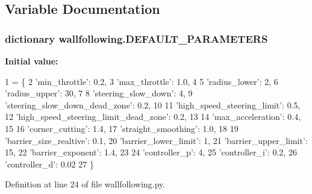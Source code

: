 \subsection{Variable Documentation}
\subsubsection[{\texorpdfstring{D\+E\+F\+A\+U\+L\+T\+\_\+\+P\+A\+R\+A\+M\+E\+T\+E\+RS}{DEFAULT_PARAMETERS}}]{\setlength{\rightskip}{0pt plus 5cm}dictionary wallfollowing.\+D\+E\+F\+A\+U\+L\+T\+\_\+\+P\+A\+R\+A\+M\+E\+T\+E\+RS}\hypertarget{namespacewallfollowing_ac161be1e11f04000d35ca725afa3ccdf}{}\label{namespacewallfollowing_ac161be1e11f04000d35ca725afa3ccdf}
{\bfseries Initial value\+:}
\begin{DoxyCode}
1 = \{
2     \textcolor{stringliteral}{'min\_throttle'}: 0.2,
3     \textcolor{stringliteral}{'max\_throttle'}: 1.0,
4 
5     \textcolor{stringliteral}{'radius\_lower'}: 2,
6     \textcolor{stringliteral}{'radius\_upper'}: 30,
7 
8     \textcolor{stringliteral}{'steering\_slow\_down'}: 4,
9     \textcolor{stringliteral}{'steering\_slow\_down\_dead\_zone'}: 0.2,
10 
11     \textcolor{stringliteral}{'high\_speed\_steering\_limit'}: 0.5,
12     \textcolor{stringliteral}{'high\_speed\_steering\_limit\_dead\_zone'}: 0.2,
13 
14     \textcolor{stringliteral}{'max\_acceleration'}: 0.4,
15 
16     \textcolor{stringliteral}{'corner\_cutting'}: 1.4,
17     \textcolor{stringliteral}{'straight\_smoothing'}: 1.0,
18 
19     \textcolor{stringliteral}{'barrier\_size\_realtive'}: 0.1,
20     \textcolor{stringliteral}{'barrier\_lower\_limit'}: 1,
21     \textcolor{stringliteral}{'barrier\_upper\_limit'}: 15,
22     \textcolor{stringliteral}{'barrier\_exponent'}: 1.4,
23 
24     \textcolor{stringliteral}{'controller\_p'}: 4,
25     \textcolor{stringliteral}{'controller\_i'}: 0.2,
26     \textcolor{stringliteral}{'controller\_d'}: 0.02
27 \}
\end{DoxyCode}


Definition at line 24 of file wallfollowing.\+py.

